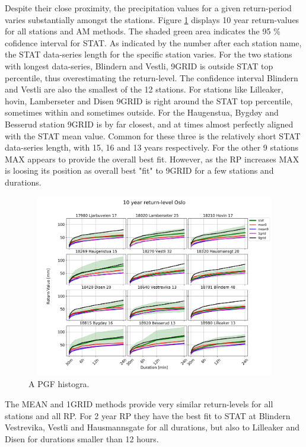 Despite their close proximity, the precipitation values for a given return-period varies substantially amongst the stations. Figure \ref{fig:1985_all_stat} displays 10 year return-values for all stations and AM methods. The shaded green area indicates the 95 \% cofidence interval for STAT. As indicated by the number after each station name, the STAT data-series length for the specific station varies. For the two stations with longest data-series, Blindern and Vestli, 9GRID is outside STAT top percentile, thus overestimating the return-level. The confidence interval Blindern and Vestli are also the smallest of the 12 stations. For stations like Lilleaker, hovin, Lamberseter and Disen 9GRID is right around the STAT top percentile, sometimes within and sometimes outside. For the Haugenstua, Bygdøy and Besserud station 9GRID is by far closest, and at times almost perfectly aligned with the STAT mean value. Common for these three is the relatively short STAT data-series length, with 15, 16 and 13 years respectively. For the other 9 stations MAX appears to provide the overall best fit. However, as the RP increases MAX is loosing its position as overall best "fit" to 9GRID for a few stations and durations.           

\begin{figure}
    \begin{center}
        \includegraphics[width=20cm,height=8cm,keepaspectratio]{figures/10_ECE_1985_all_stat.png}
    \end{center}
    \caption{A PGF histogra.}
    \label{fig:1985_all_stat}
\end{figure}

The MEAN and 1GRID methods provide very similar return-levels for all stations and all RP. For 2 year RP they have the best fit to STAT at Blindern Vestrevika, Vestli and Hausmannsgate for all durations, but also to Lilleaker and Disen for durations smaller than 12 hours. 


